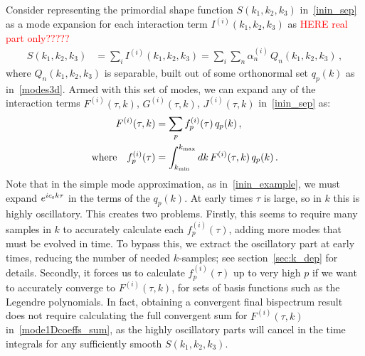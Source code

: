 Consider representing the primordial shape function $S(k_1, k_2, k_3)$ in~\eqref{inin_sep} as
a mode expansion for each interaction term $I^{(i)}(k_1, k_2,k_3)$ as
\textcolor{red}{HERE real part only?????}
\begin{align}\label{modeexp}
S(k_1, k_2,k_3) &= \sum_i I^{(i)}(k_1,k_2,k_3) =  \sum_i \sum_n \alpha_n^{(i)}  \, Q_n(k_1,k_2,k_3)\,,
\end{align}
where $Q_n(k_1,k_2,k_3)$ is separable, built out of some
orthonormal set $q_p(k)$ as in~\eqref{modes3d}.
Armed with this set of modes,
we can expand any of the interaction terms $F^{(i)}(\tau, k)$, $G^{(i)}(\tau, k)$, $J^{(i)}(\tau, k)$
in~\eqref{inin_sep} as:
\begin{align}
    F^{(i)}(\tau, k) &= \sum _p f_p^{(i)} (\tau) \, q_p(k)\,,\label{mode1Dcoeffs_sum}\\
    \text{where} \quad f_p^{(i)} (\tau)  &= \int _{k_\text{min}}^{k_\text{max}} dk \,F^{(i)}(\tau, k) \, q_p(k) \,.\label{mode1Dcoeffs_integral}
\end{align}
Note that in the simple mode approximation, as in~\eqref{inin_example},
we must expand $e^{ic_{\rm s} k\tau}$ in the terms of the $q_p(k)$.
At early times $\tau$ is large, so in $k$ this is highly oscillatory.
This creates two problems. Firstly, this seems to require many samples
in $k$ to accurately calculate each $f_p^{(i)} (\tau)$,
adding more modes that must be evolved in time.
To bypass this, we extract the oscillatory part at
early times, reducing the number of needed
$k$-samples; see section~\eqref{sec:k_dep} for details.
Secondly, it forces us to calculate $f_p^{(i)} (\tau)$
up to very high $p$ if we want to accurately converge to $F^{(i)}(\tau, k)$,
for sets of basis functions such as the Legendre polynomials.
In fact, obtaining a convergent final bispectrum result
does not require calculating the full convergent sum
for $F^{(i)}(\tau, k)$ in~\eqref{mode1Dcoeffs_sum},
as the highly oscillatory parts will cancel in the time integrals
for any sufficiently smooth $S(k_1,k_2,k_3)$.

